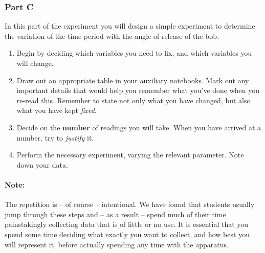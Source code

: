 \subsubsection{Part C}

In this part of the experiment you will design a simple experiment to determine the variation of the time period with the angle of release of the bob.

\begin{enumerate}
    \item Begin by deciding which variables you need to fix, and which variables you will change.
    
    \item Draw out an appropriate table in your auxiliary notebooks. Mark out any important details that would help you remember what you've done when you re-read this. Remember to state not only what you have changed, but also what you have kept \textit{fixed}.
    
    \item Decide on the \textbf{number} of readings you will take. When you have arrived at a number, try to \textit{justify} it.
    
    \item Perform the necessary experiment, varying the relevant parameter. Note down your data.
    
\end{enumerate}


\paragraph{Note:} The repetition is -- of course -- intentional. We have found that students usually jump through these steps and -- as a result -- spend much of their time painstakingly collecting data that is of little or no use. It is essential that you spend some time deciding what exactly you want to collect, and how best you will represent it, before actually spending any time with the apparatus.

